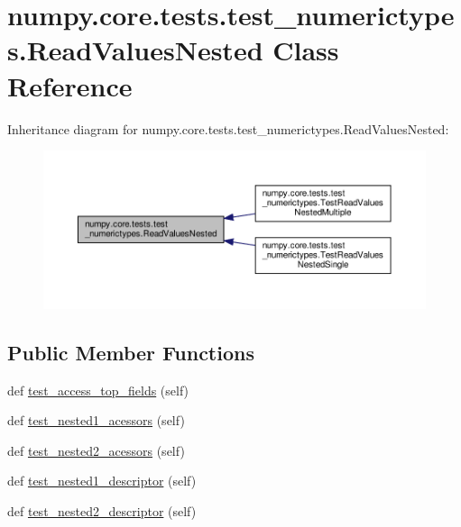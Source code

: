 \hypertarget{classnumpy_1_1core_1_1tests_1_1test__numerictypes_1_1ReadValuesNested}{}\section{numpy.\+core.\+tests.\+test\+\_\+numerictypes.\+Read\+Values\+Nested Class Reference}
\label{classnumpy_1_1core_1_1tests_1_1test__numerictypes_1_1ReadValuesNested}


Inheritance diagram for numpy.\+core.\+tests.\+test\+\_\+numerictypes.\+Read\+Values\+Nested\+:
\nopagebreak
\begin{figure}[H]
\begin{center}
\leavevmode
\includegraphics[width=350pt]{classnumpy_1_1core_1_1tests_1_1test__numerictypes_1_1ReadValuesNested__inherit__graph}
\end{center}
\end{figure}
\subsection*{Public Member Functions}
\begin{DoxyCompactItemize}
\item 
def \hyperlink{classnumpy_1_1core_1_1tests_1_1test__numerictypes_1_1ReadValuesNested_aec42947a450917a5f86b994802a392bc}{test\+\_\+access\+\_\+top\+\_\+fields} (self)
\item 
def \hyperlink{classnumpy_1_1core_1_1tests_1_1test__numerictypes_1_1ReadValuesNested_a0c9e1db450a85c0f321dba6fe9e0d3d7}{test\+\_\+nested1\+\_\+acessors} (self)
\item 
def \hyperlink{classnumpy_1_1core_1_1tests_1_1test__numerictypes_1_1ReadValuesNested_ac9e681972aac0815717ac3e47ebfb404}{test\+\_\+nested2\+\_\+acessors} (self)
\item 
def \hyperlink{classnumpy_1_1core_1_1tests_1_1test__numerictypes_1_1ReadValuesNested_ab437dfc78d456e6b9d288cd429cfa196}{test\+\_\+nested1\+\_\+descriptor} (self)
\item 
def \hyperlink{classnumpy_1_1core_1_1tests_1_1test__numerictypes_1_1ReadValuesNested_a716cf410cac5e04402ec949990206711}{test\+\_\+nested2\+\_\+descriptor} (self)
\end{DoxyCompactItemize}


